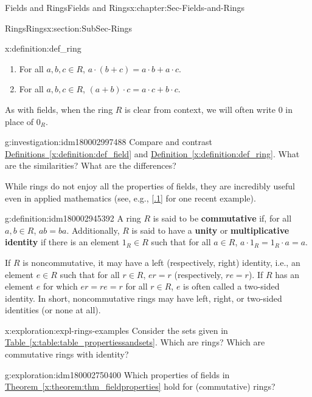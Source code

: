 \documentclass[oneside,10pt,]{book}
\newcommand{\xreffont}{\relax}
\newcommand{\terminology}[1]{\textbf{#1}}
\numberwithin{equation}{section}
\begin{document}
\begin{chapterptx}{Fields and Rings}{}{Fields and Rings}{}{}{x:chapter:Sec-Fields-and-Rings}
\begin{sectionptx}{Rings}{}{Rings}{}{}{x:section:SubSec-Rings}
\begin{definition}{}{x:definition:def_ring}
\begin{enumerate}
\item{}For all \(a,b,c\in R\), \(a\cdot (b+c) = a\cdot b + a\cdot c\).%
\item{}For all \(a,b,c\in R\), \((a+b)\cdot c = a\cdot c + b\cdot c\).%
\end{enumerate}
As with fields, when the ring \(R\) is clear from context, we will often write \(0\) in place of \(0_R\).%
\end{definition}
\begin{investigation}{}{g:investigation:idm180002997488}%
Compare and contrast \hyperref[x:definition:def_field]{Definitions~{\xreffont\ref{x:definition:def_field}}} and \hyperref[x:definition:def_ring]{Definition~{\xreffont\ref{x:definition:def_ring}}}. What are the similarities? What are the differences?%
\end{investigation}
While rings do not enjoy all the properties of fields, they are incredibly useful even in applied mathematics (see, e.g., \hyperlink{x:biblio:Curto2013}{[{\xreffont 2.2.1}]} for one recent example).%
\begin{definition}{}{g:definition:idm180002945392}%
%
%
%
A ring \(R\) is said to be \terminology{commutative} if, for all \(a,b\in R\), \(ab = ba\). Additionally, \(R\) is said to have a \terminology{unity} or \terminology{multiplicative identity} if there is an element \(1_R\in R\) such that for all \(a\in R\), \(a \cdot 1_R = 1_R \cdot a= a\).%
\end{definition}
If \(R\) is noncommutative, it may have a left (respectively, right) identity, i.e., an element \(e\in R\) such that for all \(r\in R\), \(er = r\) (respectively, \(re = r\)). If \(R\) has an element \(e\) for which \(er = re = r\) for all \(r\in R\), \(e\) is often called a two-sided identity. In short, noncommutative rings may have left, right, or two-sided identities (or none at all).%
\begin{exploration}{}{x:exploration:expl-rings-examples}%
Consider the sets given in \hyperref[x:table:table_propertiessandsets]{Table~{\xreffont\ref{x:table:table_propertiessandsets}}}. Which are rings? Which are commutative rings with identity?%
\end{exploration}
\begin{exploration}{}{g:exploration:idm180002750400}%
Which properties of fields in \hyperref[x:theorem:thm_fieldproperties]{Theorem~{\xreffont\ref{x:theorem:thm_fieldproperties}}} hold for (commutative) rings?%
\end{exploration}

\end{sectionptx}
\end{chapterptx}
\end{document}
